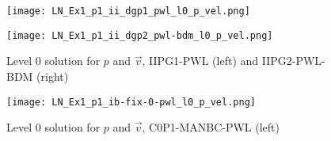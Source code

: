 \documentclass{amsart}
\begin{document}
\begin{figure}[h!]
\begin{minipage}{0.45\textwidth}
\texttt{[image: LN\_Ex1\_p1\_ii\_dgp1\_pwl\_l0\_p\_vel.png]}
\end{minipage}
\begin{minipage}{0.45\textwidth}
\texttt{[image: LN\_Ex1\_p1\_ii\_dgp2\_pwl-bdm\_l0\_p\_vel.png]}
\end{minipage}
\caption{Level 0 solution for $p$ and $\vec v$, IIPG1-PWL (left) and IIPG2-PWL-BDM (right) 
\label{fig:ex1-iipg1-pwl-iipg2-pwl-bdm}
}
\end{figure}
\begin{figure}[h!]
\begin{minipage}{0.45\textwidth}
\texttt{[image: LN\_Ex1\_p1\_ib-fix-0-pwl\_l0\_p\_vel.png]}
\end{minipage}
\caption{Level 0 solution for $p$ and $\vec v$, C0P1-MANBC-PWL (left) 
\label{fig:ex1-c0p1-manbc-pwl}
}
\end{figure}





\end{document}
